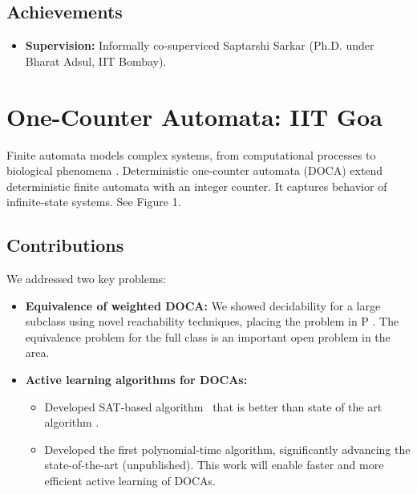 \documentclass[11pt,a4paper,sans]{moderncv} %
\begin{document}
\subsection{Achievements}
\begin{itemize}
    \item \textbf{Supervision:} Informally co-superviced Saptarshi Sarkar (Ph.D. under Bharat Adsul, IIT Bombay).
\end{itemize}


\section{One-Counter Automata: IIT Goa}
Finite automata models complex systems, from computational processes \cite{vardi95} to biological phenomena \cite{Barto75}.
Deterministic one-counter automata (DOCA) extend deterministic finite automata with an integer counter. It captures behavior of infinite-state systems. See Figure 1.

\subsection{Contributions}
We addressed two key problems:
\begin{itemize}
    \item \textbf{Equivalence of weighted DOCA:} We showed decidability for a large subclass using novel reachability techniques, placing the problem in P \cite{fsttcs23,icla25}. The equivalence problem for the full class is an important open problem in the area.
    \item \textbf{Active learning algorithms for DOCAs:}
    \begin{itemize}
    \item Developed SAT-based algorithm~\cite{learning24} that is better than state of the art algorithm \cite{gaetan}.
    \item Developed the first polynomial-time algorithm, significantly advancing the state-of-the-art (unpublished). This work will enable faster and more efficient active learning of DOCAs.
    \end{itemize}
\end{itemize}
\end{document}
